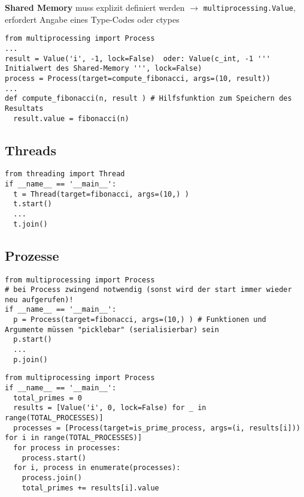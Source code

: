 \textbf{Shared Memory} muss explizit definiert werden $\rightarrow$ \lstinline{multiprocessing.Value}, erfordert Angabe eines Type-Codes oder ctypes

\begin{lstlisting}[style=Python]
from multiprocessing import Process
...
result = Value('i', -1, lock=False)  oder: Value(c_int, -1 ''' Initialwert des Shared-Memory ''', lock=False)
process = Process(target=compute_fibonacci, args=(10, result))
...
def compute_fibonacci(n, result ) # Hilfsfunktion zum Speichern des Resultats
  result.value = fibonacci(n)
\end{lstlisting}


\subsection{Threads}

\begin{lstlisting}[style=Python]
from threading import Thread
if __name__ == '__main__':
  t = Thread(target=fibonacci, args=(10,) )
  t.start()
  ...
  t.join()
\end{lstlisting}

\subsection{Prozesse}

\begin{minipage}[t]{0.5\linewidth}
    \begin{lstlisting}[style=Python]
from multiprocessing import Process
# bei Process zwingend notwendig (sonst wird der start immer wieder neu aufgerufen)!
if __name__ == '__main__':
  p = Process(target=fibonacci, args=(10,) ) # Funktionen und Argumente müssen "picklebar" (serialisierbar) sein
  p.start()
  ...
  p.join()
    \end{lstlisting}
\end{minipage}
\begin{minipage}[t]{0.48\linewidth}
    \begin{lstlisting}[style=Python]
from multiprocessing import Process
if __name__ == '__main__':
  total_primes = 0
  results = [Value('i', 0, lock=False) for _ in range(TOTAL_PROCESSES)]
  processes = [Process(target=is_prime_process, args=(i, results[i])) for i in range(TOTAL_PROCESSES)]
  for process in processes:
    process.start()
  for i, process in enumerate(processes):
    process.join()
    total_primes += results[i].value
    \end{lstlisting}
\end{minipage}



